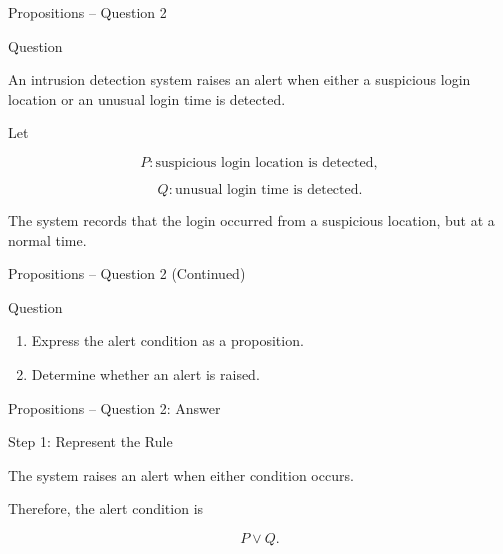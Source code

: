 
\begin{frame}{Propositions -- Question 2}

\begin{block}{Question}

An intrusion detection system raises an alert when either a suspicious
login location or an unusual login time is detected.

Let

$$
P:\text{suspicious login location is detected},
$$

$$
Q:\text{unusual login time is detected}.
$$

The system records that the login occurred from a suspicious location,
but at a normal time.

\end{block}

\end{frame}

\begin{frame}{Propositions -- Question 2 (Continued)}

\begin{block}{Question}

\begin{enumerate}
\item Express the alert condition as a proposition.
\item Determine whether an alert is raised.
\end{enumerate}

\end{block}

\end{frame}


\begin{frame}{Propositions -- Question 2: Answer}

\begin{exampleblock}{Step 1: Represent the Rule}

The system raises an alert when either condition occurs.

Therefore, the alert condition is

$$
P\lor Q.
$$

\end{exampleblock}

\end{frame}

